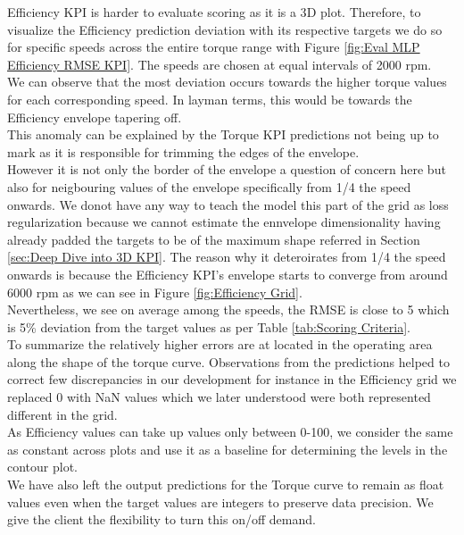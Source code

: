 \documentclass{report} %
\begin{document}
Efficiency \ac{KPI} is harder to evaluate scoring as it is a 3\ac{D} plot. 
Therefore, to visualize the Efficiency prediction deviation with its respective targets we do so for specific speeds across the entire torque range with Figure \ref{fig:Eval MLP Efficiency RMSE KPI}.
The speeds are chosen at equal intervals of 2000 rpm.\\
We can observe that the most deviation occurs towards the higher torque values for each corresponding speed. In layman terms, this would be towards the Efficiency envelope tapering off.\\
This anomaly can be explained by the Torque \ac{KPI} predictions not being up to mark as it is responsible for trimming the edges of the envelope.\\
However it is not only the border of the envelope a question of concern here but also for neigbouring values of the envelope specifically from 1/4 the speed onwards. 
We donot have any way to teach the model this part of the grid as loss regularization because we cannot estimate the ennvelope dimensionality having already padded the targets to be of the maximum shape referred in Section \ref{sec:Deep Dive into 3D KPI}.
The reason why it deteroirates from 1/4 the speed onwards is because the Efficiency \ac{KPI}'s envelope starts to converge from around 6000 rpm as we can see in Figure \ref{fig:Efficiency Grid}.\\
Nevertheless, we see on average among the speeds, the \ac{RMSE} is close to 5 which is 5\% deviation from the target values as per Table \ref{tab:Scoring Criteria}.\\

To summarize the relatively higher errors are at located in the operating area along the shape of the torque curve.
Observations from the predictions helped to correct few discrepancies in our development for instance in the Efficiency grid we replaced 0 with \ac{NaN} values which we later understood were both represented different in the grid.\\
As Efficiency values can take up values only between 0-100, we consider the same as constant across plots and use it as a baseline for determining the levels in the contour plot. \\ 
We have also left the output predictions for the Torque curve to remain as float values even when the target values are integers to preserve data precision. We give the client the flexibility to turn this on/off demand. \\
\end{document}
